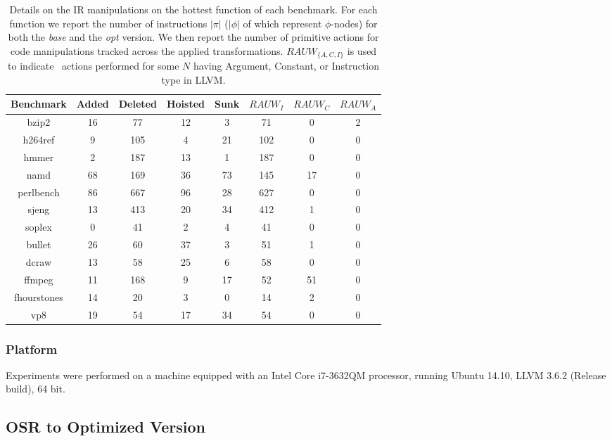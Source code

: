 \begin{table}[!t]
\begin{center}
\begin{small}
\begin{tabular}{|c|c|c|c|c|c|c|c|}
\hline
Benchmark & Added & Deleted & Hoisted & Sunk & $RAUW_I$ & $RAUW_C$ & $RAUW_A$ \\
\hline
\hline
bzip2 & 16 & 77 & 12 & 3 & 71 & 0 & 2 \\
\hline
h264ref & 9 & 105 & 4 & 21 & 102 & 0 & 0 \\
\hline
hmmer & 2 & 187 & 13 & 1 & 187 & 0 & 0 \\
\hline
namd & 68 & 169 & 36 & 73 & 145 & 17 & 0 \\
\hline
perlbench & 86 & 667 & 96 & 28 & 627 & 0 & 0 \\
\hline
sjeng & 13 & 413 & 20 & 34 & 412 & 1 & 0 \\
\hline
soplex & 0 & 41 & 2 & 4 & 41 & 0 & 0 \\
\hline
bullet & 26 & 60 & 37 & 3 & 51 & 1 & 0 \\
\hline
dcraw & 13 & 58 & 25 & 6 & 58 & 0 & 0 \\
\hline
ffmpeg & 11 & 168 & 9 & 17 & 52 & 51 & 0 \\
\hline
fhourstones & 14 & 20 & 3 & 0 & 14 & 2 & 0 \\
\hline
vp8 & 19 & 54 & 17 & 34 & 54 & 0 & 0 \\
\hline
\end{tabular}
\end{small}
\end{center}
\caption{\label{tab:OSR-alC-bench-IR} Details on the IR manipulations on the hottest function of each benchmark. For each function we report the number of instructions $|\pi|$ ($|\phi|$ of which represent $\phi$-nodes) for both the {\em base} and the {\em opt} version. We then report the number of primitive actions for code manipulations tracked across the applied transformations. $RAUW_{\{A,C,I\}}$ is used to indicate \RAUWfull\ actions performed for some {$N$} having Argument, Constant, or Instruction type in LLVM.
}
\end{table}

\subsubsection*{Platform}
Experiments were performed on a machine equipped with an Intel Core i7-3632QM processor, running Ubuntu 14.10, LLVM 3.6.2 (Release build), 64 bit.

\subsection{OSR to Optimized Version}

